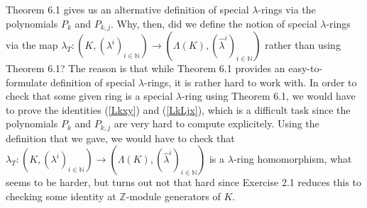 \documentclass[12pt,final,notitlepage,onecolumn,german]{article}%
\begin{document}
Theorem 6.1 gives us an alternative definition of special $\lambda$-rings via
the polynomials $P_{k}$ and $P_{k,j}$. Why, then, did we define the notion of
special $\lambda$-rings via the map $\lambda_{T}:\left(  K,\left(  \lambda
^{i}\right)  _{i\in\mathbb{N}}\right)  \rightarrow\left(  \Lambda\left(
K\right)  ,\left(  \widehat{\lambda}^{i}\right)  _{i\in\mathbb{N}}\right)  $
rather than using Theorem 6.1? The reason is that while Theorem 6.1 provides
an easy-to-formulate definition of special $\lambda$-rings, it is rather hard
to work with. In order to check that some given ring is a special $\lambda
$-ring using Theorem 6.1, we would have to prove the identities (\ref{Lkxy})
and (\ref{LkLjx}), which is a difficult task since the polynomials $P_{k}$ and
$P_{k,j}$ are very hard to compute explicitely. Using the definition that we
gave, we would have to check that $\lambda_{T}:\left(  K,\left(  \lambda
^{i}\right)  _{i\in\mathbb{N}}\right)  \rightarrow\left(  \Lambda\left(
K\right)  ,\left(  \widehat{\lambda}^{i}\right)  _{i\in\mathbb{N}}\right)  $
is a $\lambda$-ring homomorphism, what seems to be harder, but turns out not
that hard since Exercise 2.1 reduces this to checking some identity at
$\mathbb{Z}$-module generators of $K$.
\end{document}
